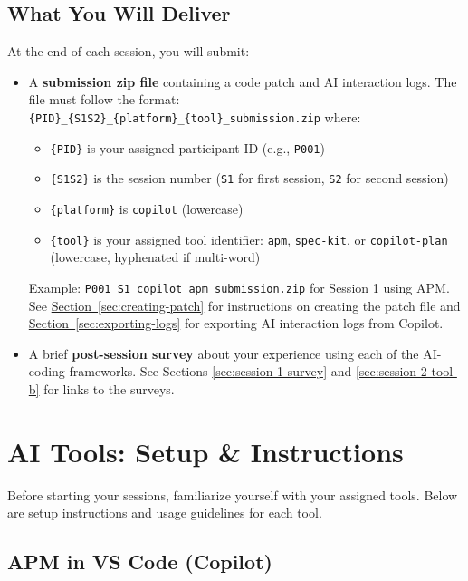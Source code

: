 \documentclass[11pt, a4paper]{article}
\begin{document}
\subsection{What You Will Deliver}
At the end of each session, you will submit:
\begin{itemize}
    \item A \textbf{submission zip file} containing a code patch and AI interaction logs. The file must follow the format: \texttt{\{PID\}\_\{S1\textbar{}S2\}\_\{platform\}\_\{tool\}\_submission.zip} where:
    \begin{itemize}
        \item \texttt{\{PID\}} is your assigned participant ID (e.g., \texttt{P001})
        \item \texttt{\{S1\textbar{}S2\}} is the session number (\texttt{S1} for first session, \texttt{S2} for second session)
        \item \texttt{\{platform\}} is \texttt{copilot} (lowercase)
        \item \texttt{\{tool\}} is your assigned tool identifier: \texttt{apm}, \texttt{spec-kit}, or \texttt{copilot-plan} (lowercase, hyphenated if multi-word)
    \end{itemize}
    Example: \texttt{P001\_S1\_copilot\_apm\_submission.zip} for Session 1 using APM.
    See \hyperref[sec:creating-patch]{Section~\ref*{sec:creating-patch}} for instructions on creating the patch file and \hyperref[sec:exporting-logs]{Section~\ref*{sec:exporting-logs}} for exporting AI interaction logs from Copilot.
    \item A brief \textbf{post-session survey} about your experience using each of the AI-coding frameworks.
    See Sections \hyperref[sec:session-1-survey]{\ref*{sec:session-1-survey}} and \hyperref[sec:session-2-tool-b]{\ref*{sec:session-2-tool-b}} for links to the surveys.
\end{itemize}

\newpage


\section{AI Tools: Setup \& Instructions}
\label{sec:ai-tools}

Before starting your sessions, familiarize yourself with your assigned tools. Below are setup instructions and usage guidelines for each tool.

\subsection{APM in VS Code (Copilot)}
\end{document}
